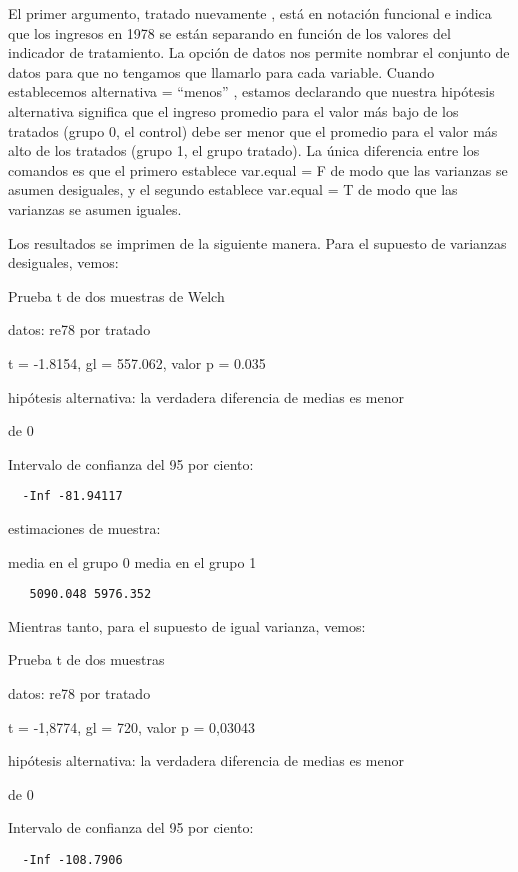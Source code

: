 \documentclass[
]{book}
\begin{document}
El primer argumento, tratado nuevamente , está en notación funcional e indica que los ingresos en 1978 se están separando en función de los valores del indicador de tratamiento. La opción de datos nos permite nombrar el conjunto de datos para que no tengamos que llamarlo para cada variable. Cuando establecemos alternativa = ``menos'' , estamos declarando que nuestra hipótesis alternativa significa que el ingreso promedio para el valor más bajo de los tratados (grupo 0, el control) debe ser menor que el promedio para el valor más alto de los tratados (grupo 1, el grupo tratado). La única diferencia entre los comandos es que el primero establece var.equal = F de modo que las varianzas se asumen desiguales, y el segundo establece var.equal = T de modo que las varianzas se asumen iguales.

Los resultados se imprimen de la siguiente manera. Para el supuesto de varianzas desiguales, vemos:

Prueba t de dos muestras de Welch

datos: re78 por tratado

t = -1.8154, gl = 557.062, valor p = 0.035

hipótesis alternativa: la verdadera diferencia de medias es menor

de 0

Intervalo de confianza del 95 por ciento:

\begin{verbatim}
  -Inf -81.94117
\end{verbatim}

estimaciones de muestra:

media en el grupo 0 media en el grupo 1

\begin{verbatim}
   5090.048 5976.352
\end{verbatim}

Mientras tanto, para el supuesto de igual varianza, vemos:

Prueba t de dos muestras

datos: re78 por tratado

t = -1,8774, gl = 720, valor p = 0,03043

hipótesis alternativa: la verdadera diferencia de medias es menor

de 0

Intervalo de confianza del 95 por ciento:

\begin{verbatim}
  -Inf -108.7906
\end{verbatim}
\end{document}
